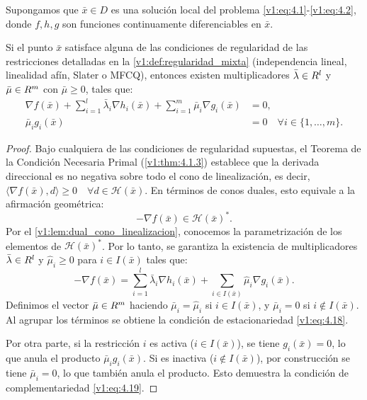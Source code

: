 \begin{theorem}\label{v1:thm:4.2.1}
 Supongamos que $\bar{x} \in D$ es una solución local del problema \eqref{v1:eq:4.1}-\eqref{v1:eq:4.2}, donde $f, h, g$ son funciones continuamente diferenciables en $\bar{x}$.
 
 Si el punto $\bar{x}$ satisface alguna de las condiciones de regularidad de las restricciones detalladas en la \cref{v1:def:regularidad_mixta} (independencia lineal, linealidad afín, Slater o MFCQ), entonces existen multiplicadores $\bar{\lambda} \in R^l$ y $\bar{\mu} \in R^m$ con $\bar{\mu} \ge 0$, tales que:
 \begin{align}
 \nabla f(\bar{x}) + \sum_{i=1}^l \bar{\lambda}_i \nabla h_i(\bar{x}) + \sum_{i=1}^m \bar{\mu}_i \nabla g_i(\bar{x}) &= 0, \label{v1:eq:4.18} \\
 \bar{\mu}_i g_i(\bar{x}) &= 0 \quad \forall i \in \{1,\dots,m\}. \label{v1:eq:4.19}
 \end{align}
\end{theorem}

\begin{proof}
 Bajo cualquiera de las condiciones de regularidad supuestas, el Teorema de la Condición Necesaria Primal (\cref{v1:thm:4.1.3}) establece que la derivada direccional es no negativa sobre todo el cono de linealización, es decir, $\langle \nabla f(\bar{x}), d \rangle \ge 0 \quad \forall d \in \mathcal{H}(\bar{x})$. En términos de conos duales, esto equivale a la afirmación geométrica:
 \[
 -\nabla f(\bar{x}) \in \mathcal{H}(\bar{x})^*.
 \]
 Por el \cref{v1:lem:dual_cono_linealizacion}, conocemos la parametrización de los elementos de $\mathcal{H}(\bar{x})^*$. Por lo tanto, se garantiza la existencia de multiplicadores $\bar{\lambda} \in R^l$ y $\hat{\mu}_i \ge 0$ para $i \in I(\bar{x})$ tales que:
 \[
 -\nabla f(\bar{x}) = \sum_{i=1}^l \bar{\lambda}_i \nabla h_i(\bar{x}) + \sum_{i \in I(\bar{x})} \hat{\mu}_i \nabla g_i(\bar{x}).
 \]
 Definimos el vector $\bar{\mu} \in R^m$ haciendo $\bar{\mu}_i = \hat{\mu}_i$ si $i \in I(\bar{x})$, y $\bar{\mu}_i = 0$ si $i \notin I(\bar{x})$. Al agrupar los términos se obtiene la condición de estacionariedad \eqref{v1:eq:4.18}.
 
 Por otra parte, si la restricción $i$ es activa ($i \in I(\bar{x})$), se tiene $g_i(\bar{x}) = 0$, lo que anula el producto $\bar{\mu}_i g_i(\bar{x})$. Si es inactiva ($i \notin I(\bar{x})$), por construcción se tiene $\bar{\mu}_i = 0$, lo que también anula el producto. Esto demuestra la condición de complementariedad \eqref{v1:eq:4.19}.
\end{proof}

